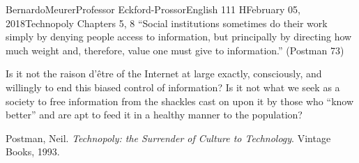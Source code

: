 \documentclass[12pt,letterpaper]{article}
\begin{document}
\begin{mla}{Bernardo}{Meurer}{Professor Eckford-Prossor}{English 111 H}{February 05, 2018}{Technopoly Chapters 5, 8}
    ``Social institutions sometimes do their work simply by denying people access to information, but principally by directing how much weight and, therefore, value one must give to information.'' (Postman 73)
    \vspace{10pt}

    Is it not the raison d'être of the Internet at large exactly, consciously, and willingly to end this biased control of information? Is it not what we seek as a society to free information from the shackles cast on upon it by those who ``know better'' and are apt to feed it in a healthy manner to the population?

    \begin{workscited}
        \bibent  Postman, Neil. \emph{Technopoly: the Surrender of Culture to Technology}. Vintage Books, 1993.
    \end{workscited}
\end{mla}
\end{document}
